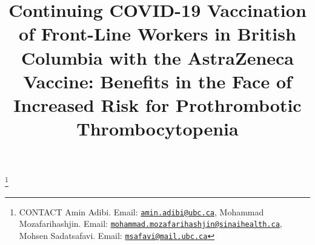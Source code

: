 \documentclass[]{interact}
\theoremstyle{plain}%
\theoremstyle{definition}
\theoremstyle{remark}
\begin{document}

\title{Continuing COVID-19 Vaccination of Front-Line Workers in British
Columbia with the AstraZeneca Vaccine: Benefits in the Face of Increased
Risk for Prothrombotic Thrombocytopenia}


\author{
}

\thanks{CONTACT Amin
Adibi. Email: \href{mailto:amin.adibi@ubc.ca}{\nolinkurl{amin.adibi@ubc.ca}}, Mohammad
Mozafarihashjin. Email: \href{mailto:mohammad.mozafarihashjin@sinaihealth.ca}{\nolinkurl{mohammad.mozafarihashjin@sinaihealth.ca}}, Mohsen
Sadatsafavi. Email: \href{mailto:msafavi@mail.ubc.ca}{\nolinkurl{msafavi@mail.ubc.ca}}}

\maketitle
\end{document}
